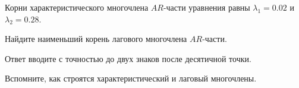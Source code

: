 
\begin{question}
Корни характеристического многочлена \(AR\)-части уравнения равны \(\lambda_1 = 0.02\) и \(\lambda_2 = 0.28\).

Найдите наименьший корень лагового многочлена \(AR\)-части.

Ответ вводите с точностью до двух знаков после десятичной точки.
\end{question}

\begin{solution}
Вспомните, как строятся характеристический и лаговый многочлены.
\end{solution}

